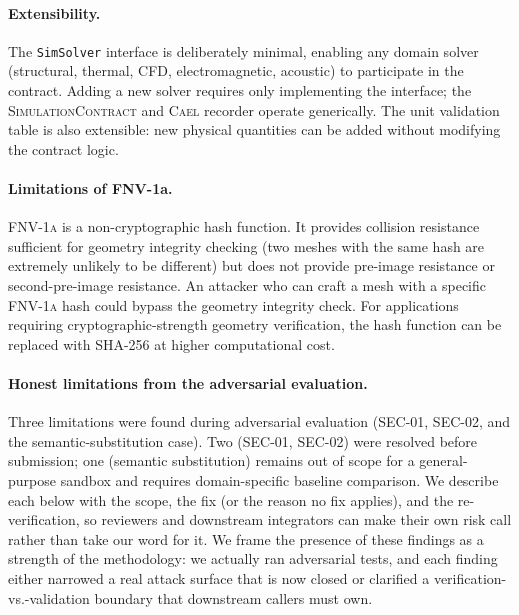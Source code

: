 \documentclass[letterpaper,twocolumn,10pt]{article}
\newcommand{\cael}{\textsc{Cael}}
\newcommand{\simcontract}{\textsc{SimulationContract}}
\newcommand{\fnvhash}{\textsc{FNV-1a}}
\begin{document}
\paragraph{Extensibility.}
The \texttt{SimSolver} interface is deliberately minimal, enabling
any domain solver (structural, thermal, CFD, electromagnetic, acoustic)
to participate in the contract. Adding a new solver requires only
implementing the interface; the \simcontract{} and \cael{} recorder
operate generically. The unit validation table is also extensible:
new physical quantities can be added without modifying the contract logic.

\paragraph{Limitations of FNV-1a.}
\fnvhash{} is a non-cryptographic hash function. It provides collision
resistance sufficient for geometry integrity checking (two meshes
with the same hash are extremely unlikely to be different) but does
not provide pre-image resistance or second-pre-image resistance.
An attacker who can craft a mesh with a specific \fnvhash{} hash
could bypass the geometry integrity check. For applications requiring
cryptographic-strength geometry verification, the hash function can
be replaced with SHA-256 at higher computational cost.

\paragraph{Honest limitations from the adversarial evaluation.}
Three limitations were found during adversarial evaluation (SEC-01,
SEC-02, and the semantic-substitution case). Two (SEC-01, SEC-02)
were resolved before submission; one (semantic substitution) remains
out of scope for a general-purpose sandbox and requires
domain-specific baseline comparison. We describe each below with the
scope, the fix (or the reason no fix applies), and the
re-verification, so reviewers and downstream integrators can make
their own risk call rather than take our word for it. We frame the
presence of these findings as a strength of the methodology: we
actually ran adversarial tests, and each finding either narrowed a
real attack surface that is now closed or clarified a
verification-vs.-validation boundary that downstream callers must
own.
\end{document}
